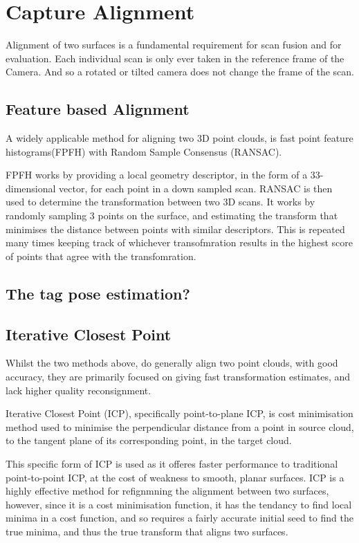 \section{Capture Alignment}

Alignment of two surfaces is a fundamental requirement for scan fusion and for evaluation. Each individual scan is only ever taken in the reference frame of the Camera. And so a rotated or tilted camera does not change the frame of the scan.  

\subsection{Feature based Alignment}

A widely applicable method for aligning two 3D point clouds, is fast point feature histograms(FPFH) with Random Sample Consensus (RANSAC).

FPFH works by providing a local geometry descriptor, in the form of a 33-dimensional vector, for each point in a down sampled scan. RANSAC is then used to determine the transformation between two 3D scans. It works by randomly sampling 3 points on the surface, and estimating the transform that minimises the distance between points with similar descriptors. This is repeated many times keeping track of whichever transofmration results in the highest score of points that agree with the transfomration.

\subsection{The tag pose estimation?}

\subsection{Iterative Closest Point}
Whilst the two methods above, do generally align two point clouds, with good accuracy, they are primarily focused on giving fast transformation estimates, and lack higher quality reconsignment.

Iterative Closest Point (ICP), specifically point-to-plane ICP, is cost minimisation method used to minimise the perpendicular distance from a point in source cloud, to the tangent plane of its corresponding point, in the target cloud.

This specific form of ICP is used as it offeres faster performance to traditional point-to-point ICP, at the cost of weakness to smooth, planar surfaces. ICP is a highly effective method for refignmning the alignment between two surfaces, however, since it is a cost minimisation function, it has the tendancy to find local minima in a cost function, and so requires a fairly accurate initial seed to find the true minima, and thus the true transform that aligns two surfaces. 

